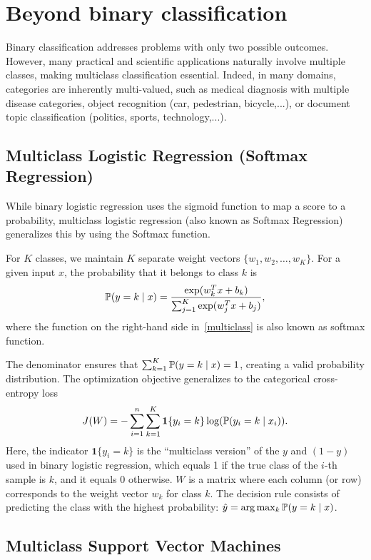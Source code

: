 \section{Beyond binary classification}

Binary classification addresses problems with only two possible outcomes. However, many practical and scientific applications naturally involve multiple classes, making multiclass classification essential.
Indeed, in many domains, categories are inherently multi-valued, such as 
medical diagnosis with multiple disease categories, object recognition (car, pedestrian, bicycle,...), or document topic classification (politics, sports, technology,...).

\subsection{Multiclass Logistic Regression (Softmax Regression)}

While binary logistic regression uses the sigmoid function to map a score to a probability, multiclass logistic regression (also known as Softmax Regression) generalizes this by using the Softmax function.

For $K$ classes, we maintain $K$ separate weight vectors $\{w_1, w_2, \dots, w_K\}$. For a given input $x$, the probability that it belongs to class $k$ is
\begin{equation}    \label{multiclass}
\P(y=k \mid x) = \frac{\exp(w_k^T x+b_k)}{\sum_{j=1}^K \exp(w_j^T x + b_j)},
\end{equation}
where the function on the right-hand side in~\eqref{multiclass} is also known as softmax function.


The denominator ensures that $\sum_{k=1}^K \P(y=k \mid x) = 1$, creating a valid probability distribution.
The optimization objective generalizes to the categorical cross-entropy loss
$$J(W) = -\sum_{i=1}^n \sum_{k=1}^K \mathbf{1}\{y_i = k\} \log(\P(y_i=k \mid x_i)).$$
Here, the indicator $\mathbf{1}\{y_i = k\}$ is the ``multiclass version'' of the $y$ and $(1-y)$ used in binary logistic regression, which equals 1 if the true class of the 
$i$-th sample is $k$, and it equals 0 otherwise.  
$W$ is a matrix where each column (or row) corresponds to the weight vector $w_k$ for class $k$.
The decision rule consists of predicting the class with the highest probability: $\hat{y} = \arg\max_k \P(y=k \mid x)$.

\subsection{Multiclass Support Vector Machines}

